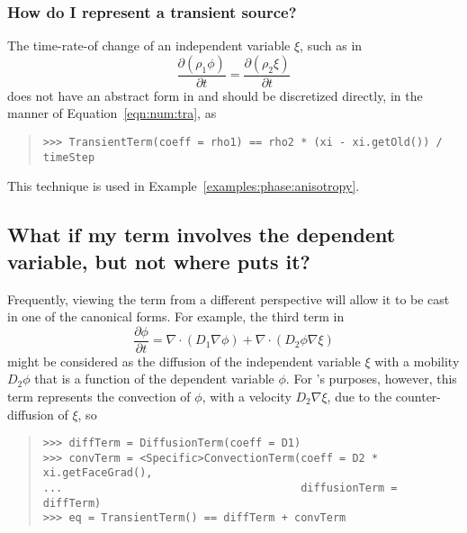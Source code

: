                 \subsubsection{How do I represent a transient source?}
                    The time-rate-of change of an independent variable
                    $\xi$, such as in
                    \[
                        \frac{\partial (\rho_1 \phi)}{\partial t}
                        = \frac{\partial (\rho_2 \xi)}{\partial t}
                    \]
                    does not have an abstract form in \FiPy{} and
                    should be discretized directly, in the manner of
                    Equation~\eqref{eqn:num:tra}, as
                    \begin{quote}
\begin{verbatim}
>>> TransientTerm(coeff = rho1) == rho2 * (xi - xi.getOld()) / timeStep
\end{verbatim}
                    \end{quote}
                    This technique is used in
                    Example~\ref{examples:phase:anisotropy}.
                    
        \subsection{What if my term involves the dependent variable, 
            but not where \FiPy{} puts it?}
            
            Frequently, viewing the term from a different perspective
            will allow it to be cast in one of the canonical forms.
            For example, the third term in
            \[
                \frac{\partial \phi}{\partial t} 
                = \nabla\cdot\left( D_1 \nabla \phi\right)
                + \nabla\cdot\left( D_2 \phi \nabla \xi\right)
            \]
            might be considered as the diffusion of the independent
            variable $\xi$ with a mobility $D_2\phi$ that is a
            function of the dependent variable $\phi$.  For \FiPy{}'s
            purposes, however, this term represents the convection of
            $\phi$, with a velocity $D_2\nabla\xi$, due to the
            counter-diffusion of $\xi$, so
            \begin{quote}
\begin{verbatim}
>>> diffTerm = DiffusionTerm(coeff = D1)
>>> convTerm = <Specific>ConvectionTerm(coeff = D2 * xi.getFaceGrad(), 
...                                     diffusionTerm = diffTerm)
>>> eq = TransientTerm() == diffTerm + convTerm
\end{verbatim}
            \end{quote}

